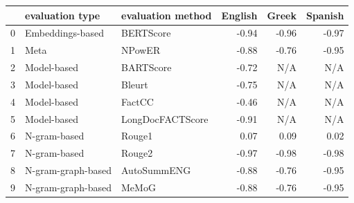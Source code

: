 \begin{tabular}{lllrrr}
\toprule
 & evaluation type & evaluation method & English & Greek & Spanish \\
\midrule
0 & Embeddings-based & BERTScore & -0.94 & -0.96 & -0.97 \\
1 & Meta & NPowER & -0.88 & -0.76 & -0.95 \\
2 & Model-based & BARTScore & -0.72 & N/A & N/A \\
3 & Model-based & Bleurt & -0.75 & N/A & N/A \\
4 & Model-based & FactCC & -0.46 & N/A & N/A \\
5 & Model-based & LongDocFACTScore & -0.91 & N/A & N/A \\
6 & N-gram-based & Rouge1 & 0.07 & 0.09 & 0.02 \\
7 & N-gram-based & Rouge2 & -0.97 & -0.98 & -0.98 \\
8 & N-gram-graph-based & AutoSummENG & -0.88 & -0.76 & -0.95 \\
9 & N-gram-graph-based & MeMoG & -0.88 & -0.76 & -0.95 \\
\bottomrule
\end{tabular}
